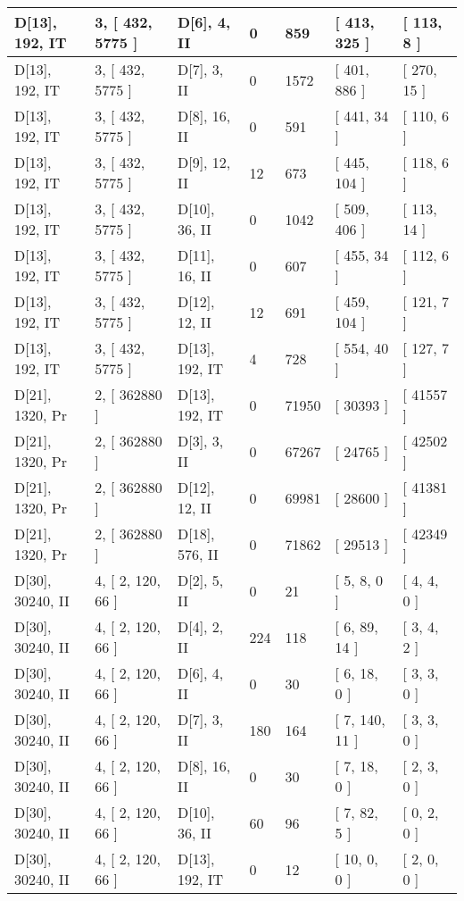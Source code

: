 \documentclass[9 pt]{scrartcl}
\begin{document}
\begin{longtable}{ |p{3em}|p{6em}|p{3em}|p{2em}|p{2em}|p{6em}|p{6em}| }
D[13], 192, IT &3, [ 432, 5775 ] & D[6], 4, II  & 0 & 859 & [ 413, 325 ] & [ 113, 8 ]\\ \hline
D[13], 192, IT &3, [ 432, 5775 ] & D[7], 3, II  & 0 & 1572 & [ 401, 886 ] & [ 270, 15 ]\\ \hline
D[13], 192, IT &3, [ 432, 5775 ] & D[8], 16, II  & 0 & 591 & [ 441, 34 ] & [ 110, 6 ]\\ \hline
D[13], 192, IT &3, [ 432, 5775 ] & D[9], 12, II  & 12 & 673 & [ 445, 104 ] & [ 118, 6 ]\\ \hline
D[13], 192, IT &3, [ 432, 5775 ] & D[10], 36, II  & 0 & 1042 & [ 509, 406 ] & [ 113, 14 ]\\ \hline
D[13], 192, IT &3, [ 432, 5775 ] & D[11], 16, II  & 0 & 607 & [ 455, 34 ] & [ 112, 6 ]\\ \hline
D[13], 192, IT &3, [ 432, 5775 ] & D[12], 12, II  & 12 & 691 & [ 459, 104 ] & [ 121, 7 ]\\ \hline
D[13], 192, IT &3, [ 432, 5775 ] & D[13], 192, IT  & 4 & 728 & [ 554, 40 ] & [ 127, 7 ]\\ \hline
D[21], 1320, Pr &2, [ 362880 ] & D[13], 192, IT  & 0 & 71950 & [ 30393 ] & [ 41557 ]\\ \hline
D[21], 1320, Pr &2, [ 362880 ] & D[3], 3, II  & 0 & 67267 & [ 24765 ] & [ 42502 ]\\ \hline
D[21], 1320, Pr &2, [ 362880 ] & D[12], 12, II  & 0 & 69981 & [ 28600 ] & [ 41381 ]\\ \hline
D[21], 1320, Pr &2, [ 362880 ] & D[18], 576, II  & 0 & 71862 & [ 29513 ] & [ 42349 ]\\ \hline
D[30], 30240, II &4, [ 2, 120, 66 ] & D[2], 5, II  & 0 & 21 & [ 5, 8, 0 ] & [ 4, 4, 0 ]\\ \hline
D[30], 30240, II &4, [ 2, 120, 66 ] & D[4], 2, II  & 224 & 118 & [ 6, 89, 14 ] & [ 3, 4, 2 ]\\ \hline
D[30], 30240, II &4, [ 2, 120, 66 ] & D[6], 4, II  & 0 & 30 & [ 6, 18, 0 ] & [ 3, 3, 0 ]\\ \hline
D[30], 30240, II &4, [ 2, 120, 66 ] & D[7], 3, II  & 180 & 164 & [ 7, 140, 11 ] & [ 3, 3, 0 ]\\ \hline
D[30], 30240, II &4, [ 2, 120, 66 ] & D[8], 16, II  & 0 & 30 & [ 7, 18, 0 ] & [ 2, 3, 0 ]\\ \hline
D[30], 30240, II &4, [ 2, 120, 66 ] & D[10], 36, II  & 60 & 96 & [ 7, 82, 5 ] & [ 0, 2, 0 ]\\ \hline
D[30], 30240, II &4, [ 2, 120, 66 ] & D[13], 192, IT  & 0 & 12 & [ 10, 0, 0 ] & [ 2, 0, 0 ]\\ \hline

\end{longtable}
\end{document}
